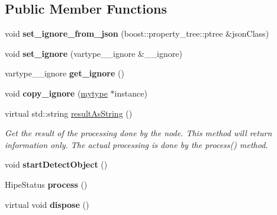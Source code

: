 \subsection*{Public Member Functions}
\begin{DoxyCompactItemize}
\item 
\mbox{\label{classfilter_1_1algos_1_1_kill_aad89da42d82fa41b591ac991a91805d7}} 
void {\bfseries set\+\_\+ignore\+\_\+from\+\_\+json} (boost\+::property\+\_\+tree\+::ptree \&json\+Class)
\item 
\mbox{\label{classfilter_1_1algos_1_1_kill_a7f0367671a64d82b69e798a612d8c79d}} 
void {\bfseries set\+\_\+ignore} (vartype\+\_\+\+\_\+ignore \&\+\_\+\+\_\+ignore)
\item 
\mbox{\label{classfilter_1_1algos_1_1_kill_a6e6d4e920735b0c53f1386c6013eeeed}} 
vartype\+\_\+\+\_\+ignore {\bfseries get\+\_\+ignore} ()
\item 
\mbox{\label{classfilter_1_1algos_1_1_kill_acfbe99e8733be0ab834ea3a0d278ba70}} 
void {\bfseries copy\+\_\+ignore} (\hyperlink{classfilter_1_1algos_1_1_kill}{mytype} $\ast$instance)
\item 
virtual std\+::string \hyperlink{classfilter_1_1algos_1_1_kill_af12b57f54905370350c6a7f291f99a6c}{result\+As\+String} ()
\begin{DoxyCompactList}\small\item\em Get the result of the processing done by the node. This method will return information only. The actual processing is done by the process() method. \end{DoxyCompactList}\item 
\mbox{\label{classfilter_1_1algos_1_1_kill_a3886bdd3503ee63c5129055ba85c77a8}} 
void {\bfseries start\+Detect\+Object} ()
\item 
\mbox{\label{classfilter_1_1algos_1_1_kill_a6716b4ced121921b1e0c94743d026d04}} 
Hipe\+Status {\bfseries process} ()
\item 
\mbox{\label{classfilter_1_1algos_1_1_kill_a63d1e8efa65b1e2b334ebe1aab7ce96d}} 
virtual void {\bfseries dispose} ()
\end{DoxyCompactItemize}
